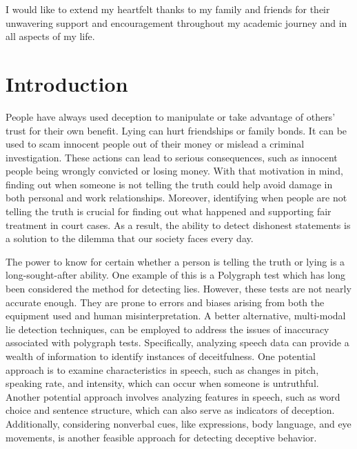 \documentclass[12pt]{article}
\begin{document}
\noindent  
I would like to extend my heartfelt thanks to my family and friends for their unwavering support and encouragement throughout my academic journey and in all aspects of my life.

\bigskip

\newpage
\tableofcontents
\newpage
\bigskip
\listoffigures
\listoftables


\newpage
\vspace{-0.1in}
\section{Introduction}
\label{sec:intro}
People have always used deception to manipulate or take advantage of others' trust for their own benefit. Lying can hurt friendships or family bonds. It can be used to scam innocent people out of their money or mislead a criminal investigation. These actions can lead to serious consequences, such as innocent people being wrongly convicted or losing money. With that motivation in mind, finding out when someone is not telling the truth could help avoid damage in both personal and work relationships. 
Moreover, identifying when people are not telling the truth is crucial for finding out what happened and supporting fair treatment in court cases. As a result, the ability to detect dishonest statements is a solution to the dilemma that our society faces every day. 
  
The power to know for certain whether a person is telling the truth or lying is a long-sought-after ability. 
One example of this is a Polygraph test which has long been considered the method for detecting lies. However, these tests are not nearly accurate enough. They are prone to errors and biases arising from both the equipment used and human misinterpretation. A better alternative, multi-modal lie detection techniques, can be employed to address the issues of inaccuracy associated with polygraph tests. Specifically, analyzing speech data can provide a wealth of information to identify instances of deceitfulness. One potential approach is to examine characteristics in speech, such as changes in pitch, speaking rate, and intensity, which can occur when someone is untruthful. Another potential approach involves analyzing features in speech, such as word choice and sentence structure, which can also serve as indicators of deception. Additionally, considering nonverbal cues, like expressions, body language, and eye movements, is another feasible approach for detecting deceptive behavior.
\end{document}
